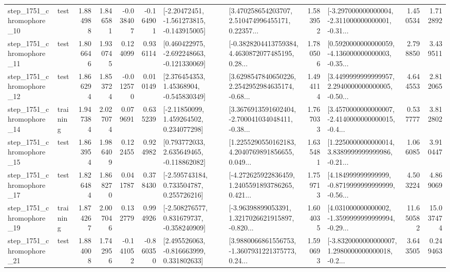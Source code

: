 \begin{tabular}{llrrrrllrlrr}
 step\_1751\_chromophore\_10 &      test &      1.884988 &    1.846581 &     -0.038407 & -0.164901 &   [-2.20472451, -1.561273815, -0.143915005] &  [3.470258654203707, 2.510474996455171, 0.22357... &       1.583952 &  [-3.297000000000004, -2.311000000000001, -0.31... &            1.450534 &          1.712892 \\
 step\_1751\_chromophore\_11 &      test &      1.806646 &    1.930745 &      0.124099 &  0.936114 &   [0.460422975, -2.692248663, -0.121330069] &  [-0.3828204413759384, 4.4630872077485195, 0.28... &       1.780506 &  [0.5920000000000059, -4.136000000000003, -0.35... &            2.798850 &          3.439511 \\
 step\_1751\_chromophore\_12 &      test &      1.866294 &    1.853724 &     -0.012570 &  0.010149 &     [2.376454353, 1.45368904, -0.545830349] &  [3.6298547840650226, 2.2542952984635174, -0.68... &       1.494114 &  [3.4499999999999957, 2.2940000000000005, -0.50... &            4.644553 &          2.812065 \\
 step\_1751\_chromophore\_14 &  training &      1.947384 &    2.027074 &      0.079691 &  0.635239 &     [-2.11850099, 1.459264502, 0.234077298] &  [3.3676913591602404, -2.700041034048411, -0.38... &       1.767033 &  [3.4570000000000007, -2.4140000000000015, -0.4... &            0.537777 &          3.812802 \\
 step\_1751\_chromophore\_15 &      test &      1.863954 &    1.986409 &      0.122455 &  0.924982 &    [0.793772033, 2.635649465, -0.118862082] &  [1.2255290550162183, 4.2040769891856655, 0.049... &       1.635481 &  [1.2250000000000014, 3.8389999999999986, -0.21... &            1.066085 &          3.910447 \\
 step\_1751\_chromophore\_17 &      test &      1.826484 &    1.868270 &      0.041787 &  0.378430 &    [-2.595743184, 0.733504787, 0.255726216] &  [-4.272625922836459, 1.2405591893786265, 0.421... &       1.759713 &  [4.184999999999999, -0.8719999999999999, -0.56... &            4.503224 &          4.869069 \\
 step\_1751\_chromophore\_19 &  training &      1.874267 &    2.007046 &      0.132779 &  0.994926 &   [-2.508276577, 0.831679737, -0.358240909] &  [-3.96398899053391, 1.3217026621915897, -0.820... &       1.604035 &  [4.031000000000002, -1.3599999999999994, -0.29... &           11.650582 &         15.037474 \\
 step\_1751\_chromophore\_21 &      test &      1.884008 &    1.742956 &     -0.141052 & -0.860350 &    [2.495526063, -0.816663999, 0.331802633] &  [3.9880066861556753, -1.3607931221375773, 0.24... &       1.590693 &  [-3.8320000000000007, 1.2980000000000018, -0.2... &            3.643505 &          0.249463 \\

\end{tabular}
